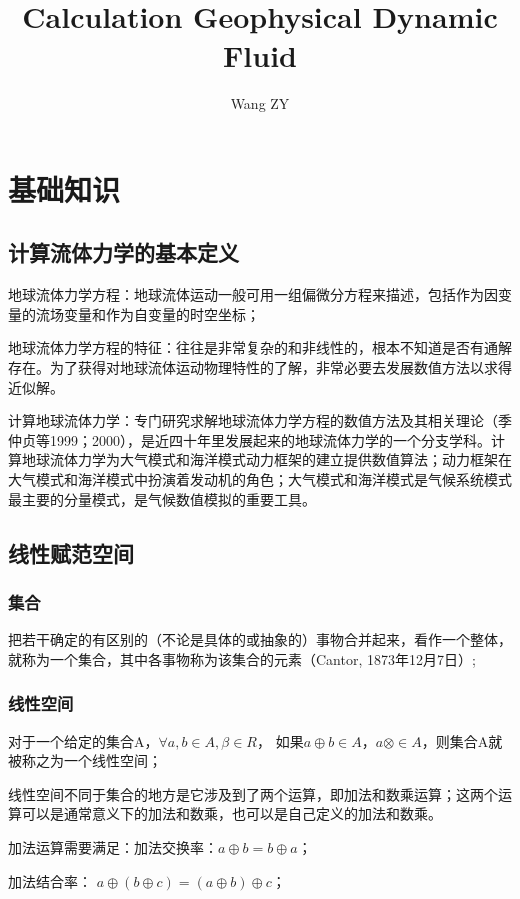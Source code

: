 \documentclass{article}
\title{Calculation Geophysical Dynamic Fluid}
\author{Wang ZY} %
\begin{document}
\maketitle
\tableofcontents
\newpage

\section{基础知识}
\subsection{计算流体力学的基本定义}
地球流体力学方程：地球流体运动一般可用一组偏微分方程来描述，包括作为因变量的流场变量和作为自变量的时空坐标；

地球流体力学方程的特征：往往是非常复杂的和非线性的，根本不知道是否有通解存在。为了获得对地球流体运动物理特性的了解，非常必要去发展数值方法以求得近似解。

计算地球流体力学：专门研究求解地球流体力学方程的数值方法及其相关理论（季仲贞等1999；2000），是近四十年里发展起来的地球流体力学的一个分支学科。计算地球流体力学为大气模式和海洋模式动力框架的建立提供数值算法；动力框架在大气模式和海洋模式中扮演着发动机的角色；大气模式和海洋模式是气候系统模式最主要的分量模式，是气候数值模拟的重要工具。

\subsection{线性赋范空间}
\subsubsection{集合}
把若干确定的有区别的（不论是具体的或抽象的）事物合并起来，看作一个整体，就称为一个集合，其中各事物称为该集合的元素（Cantor, 1873年12月7日）;

\subsubsection{线性空间}
对于一个给定的集合A，$\forall a,b\in A, \beta\in R$， 如果$a\oplus b\in A，a\otimes\in A$，则集合A就被称之为一个线性空间；

线性空间不同于集合的地方是它涉及到了两个运算，即加法和数乘运算；这两个运算可以是通常意义下的加法和数乘，也可以是自己定义的加法和数乘。

加法运算需要满足：加法交换率：$a\oplus b = b \oplus a$；

加法结合率： $a \oplus (b \oplus c) = (a \oplus b) \oplus c $；
\end{document}
